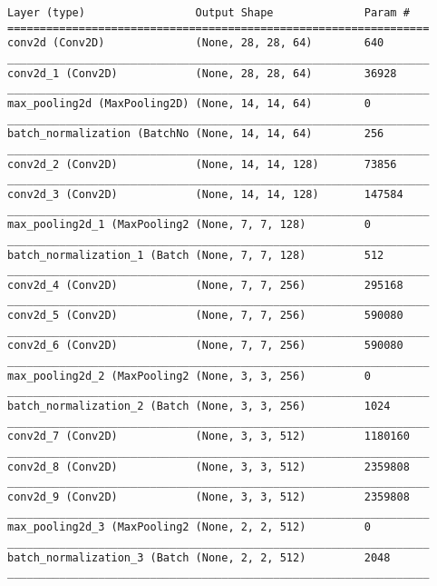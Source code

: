 \begin{lstlisting}[style=kaolstplain,linewidth=1.5\textwidth]
Layer (type)                 Output Shape              Param #   
=================================================================
conv2d (Conv2D)              (None, 28, 28, 64)        640       
_________________________________________________________________
conv2d_1 (Conv2D)            (None, 28, 28, 64)        36928     
_________________________________________________________________
max_pooling2d (MaxPooling2D) (None, 14, 14, 64)        0         
_________________________________________________________________
batch_normalization (BatchNo (None, 14, 14, 64)        256       
_________________________________________________________________
conv2d_2 (Conv2D)            (None, 14, 14, 128)       73856     
_________________________________________________________________
conv2d_3 (Conv2D)            (None, 14, 14, 128)       147584    
_________________________________________________________________
max_pooling2d_1 (MaxPooling2 (None, 7, 7, 128)         0         
_________________________________________________________________
batch_normalization_1 (Batch (None, 7, 7, 128)         512       
_________________________________________________________________
conv2d_4 (Conv2D)            (None, 7, 7, 256)         295168    
_________________________________________________________________
conv2d_5 (Conv2D)            (None, 7, 7, 256)         590080    
_________________________________________________________________
conv2d_6 (Conv2D)            (None, 7, 7, 256)         590080    
_________________________________________________________________
max_pooling2d_2 (MaxPooling2 (None, 3, 3, 256)         0         
_________________________________________________________________
batch_normalization_2 (Batch (None, 3, 3, 256)         1024      
_________________________________________________________________
conv2d_7 (Conv2D)            (None, 3, 3, 512)         1180160   
_________________________________________________________________
conv2d_8 (Conv2D)            (None, 3, 3, 512)         2359808   
_________________________________________________________________
conv2d_9 (Conv2D)            (None, 3, 3, 512)         2359808   
_________________________________________________________________
max_pooling2d_3 (MaxPooling2 (None, 2, 2, 512)         0         
_________________________________________________________________
batch_normalization_3 (Batch (None, 2, 2, 512)         2048      
_________________________________________________________________

\end{lstlisting}
